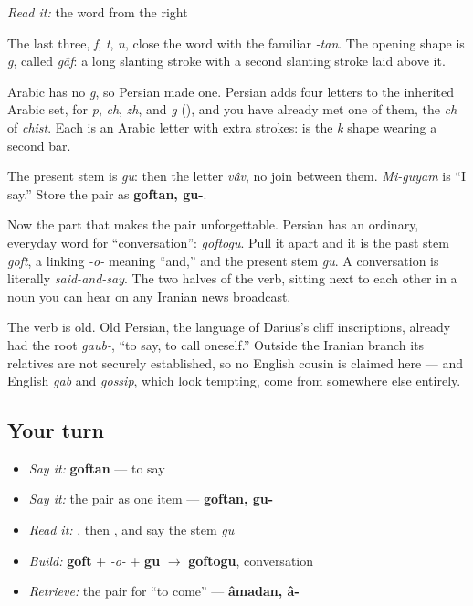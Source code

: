 \emph{Read it:} the word from the right

The last three, \textbf{} \emph{f}, \textbf{} \emph{t}, \textbf{} \emph{n}, close the word with the familiar \emph{-tan}. The opening shape is \textbf{} \emph{g}, called \emph{gâf}: a long slanting stroke with a second slanting stroke laid above it.

Arabic has no \emph{g}, so Persian made one. Persian adds four letters to the inherited Arabic set, for \emph{p}, \emph{ch}, \emph{zh}, and \emph{g} (\textbf{}), and you have already met one of them, the \emph{ch} of \emph{chist}. Each is an Arabic letter with extra strokes: \textbf{} is the \emph{k} shape wearing a second bar.

\begin{cousinweb}
The present stem is \emph{gu}: \textbf{} then the letter \emph{vâv}, no join between them. \emph{Mi-guyam} is “I say.” Store the pair as \textbf{goftan, gu-}.

Now the part that makes the pair unforgettable. Persian has an ordinary, everyday word for “conversation”: \emph{goftogu}. Pull it apart and it is the past stem \textbf{} \emph{goft}, a linking \emph{-o-} meaning “and,” and the present stem \emph{gu}. A conversation is literally \emph{said-and-say}. The two halves of the verb, sitting next to each other in a noun you can hear on any Iranian news broadcast.

The verb is old. Old Persian, the language of Darius's cliff inscriptions, already had the root \emph{gaub-}, “to say, to call oneself.” Outside the Iranian branch its relatives are not securely established, so no English cousin is claimed here — and English \emph{gab} and \emph{gossip}, which look tempting, come from somewhere else entirely.
\end{cousinweb}

\subsection*{Your turn}
\begin{itemize}
\raggedright
  \item \emph{Say it:} \textbf{goftan} — to say
  \item \emph{Say it:} the pair as one item — \textbf{goftan, gu-}
  \item \emph{Read it:} \textbf{}, then \textbf{}, and say the stem \emph{gu}
  \item \emph{Build:} \textbf{goft} + \emph{-o-} + \textbf{gu} $\to$ \textbf{goftogu}, conversation
  \item \emph{Retrieve:} the pair for “to come” — \textbf{âmadan, â-}
\end{itemize}

